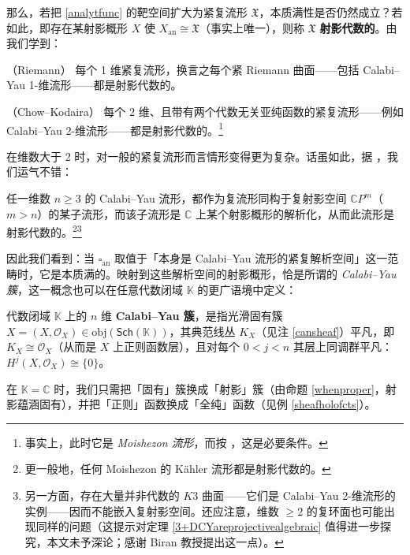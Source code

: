 
那么，若把 \eqref{analytfunc} 的靶空间扩大为紧复流形 $\mathfrak{X}$，本质满性是否仍然成立？若如此，即存在某射影概形 $X$ 使 $X_\text{an}\cong\mathfrak{X}$（事实上唯一），则称 $\mathfrak{X}$ \textbf{射影代数的}。由 \cite[第 B.3 节]{[Har77]} 我们学到：

\begin{Thm}
	\textup{（Riemann）} 每个 1 维紧复流形，换言之每个紧 Riemann 曲面——包括 Calabi--Yau 1-维流形——都是射影代数的。

	\textup{（Chow--Kodaira）} 每个 2 维、且带有两个代数无关亚纯函数的紧复流形——例如 Calabi--Yau 2-维流形——都是射影代数的。\footnote{事实上，此时它是 \textit{Moishezon 流形}，而按 \cite[命题 B.3.3]{[Har77]}，这是必要条件。}
\end{Thm}

在维数大于 2 时，对一般的紧复流形而言情形变得更为复杂。话虽如此，据 \cite[定理 5.8]{[GHJ03]}，我们运气不错：

\begin{Thm}\label{3+DCYareprojectivealgebraic}
	任一维数 $n\geq 3$ 的 Calabi--Yau 流形，都作为复流形同构于复射影空间 $\mathbb{C}P^m$（$m>n$）的某子流形，而该子流形是 $\mathbb{C}$ 上某个射影概形的解析化，从而此流形是射影代数的。\footnote{更一般地，任何 Moishezon 的 Kähler 流形都是射影代数的。}\footnote{另一方面，存在大量并非代数的 $K3$ 曲面——它们是 Calabi--Yau 2-维流形的实例——因而不能嵌入复射影空间。还应注意，维数 $\geq 2$ 的复环面也可能出现同样的问题（这提示对定理 \ref{3+DCYareprojectivealgebraic} 值得进一步探究，本文未予深论；感谢 Biran 教授提出这一点）。}
\end{Thm}

因此我们看到：当 $\square_\text{an}$ 取值于「本身是 Calabi--Yau 流形的紧复解析空间」这一范畴时，它是本质满的。映射到这些解析空间的射影概形，恰是所谓的 \textit{Calabi--Yau 簇}，这一概念也可以在任意代数闭域 $\mathbb{K}$ 的更广语境中定义：

\begin{Def}\label{Calabiyauvar}
	代数闭域 $\mathbb{K}$ 上的 $n$ 维 \textbf{Calabi--Yau 簇}，是指光滑固有簇 $X=(X,\mathcal{O}_X)\in\text{obj}(\mathsf{Sch}(\mathbb{K}))$，其典范线丛 $K_X$（见注 \ref{cansheaf}）平凡，即 $K_X\cong\mathcal{O}_X$（从而是 $X$ 上正则函数层），且对每个 $0< j<n$ 其层上同调群平凡：$H^j(X,\mathcal{O}_X)\cong\{0\}$。

	在 $\mathbb{K}=\mathbb{C}$ 时，我们只需把「固有」簇换成「射影」簇（由命题 \ref{whenproper}，射影蕴涵固有），并把「正则」函数换成「全纯」函数（见例 \ref{sheafholofcts}）。
\end{Def}

